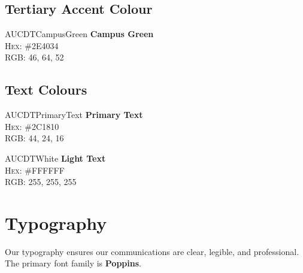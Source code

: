 \documentclass[a4paper, 11pt]{article}
\begin{document}
\subsection{Tertiary Accent Colour}
\begin{center}
    \begin{colorswatch}{AUCDTCampusGreen}
         \textbf{Campus Green} \\ \textsc{Hex:} \#2E4034 \\ \textsc{RGB:} 46, 64, 52
    \end{colorswatch}
\end{center}

\subsection{Text Colours}
\begin{center}
    \begin{tcbraster}[raster columns=2, raster equal height, raster column skip=5mm]
        \begin{colorswatch}{AUCDTPrimaryText}
            \textbf{Primary Text} \\ \textsc{Hex:} \#2C1810 \\ \textsc{RGB:} 44, 24, 16
        \end{colorswatch}
        \begin{colorswatch}[coltext=AUCDTPrimaryText]{AUCDTWhite}
            \textbf{Light Text} \\ \textsc{Hex:} \#FFFFFF \\ \textsc{RGB:} 255, 255, 255
        \end{colorswatch}
    \end{tcbraster}
\end{center}

\section{Typography}
Our typography ensures our communications are clear, legible, and professional. The primary font family is \textbf{Poppins}.
\end{document}
